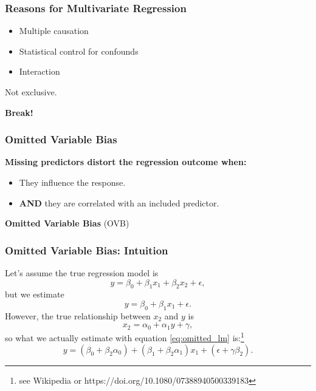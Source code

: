 \documentclass{beamer}
\begin{document}
\begin{frame}
  \frametitle{Reasons for Multivariate Regression}
  \begin{itemize}
    \item Multiple causation
    \item Statistical control for confounds
    \item Interaction
  \end{itemize}

Not exclusive.

\end{frame}

\begin{frame}
    \centering
    \huge\color{purple}\textbf{Break!}
\end{frame}

\begin{frame}
  \frametitle{Omitted Variable Bias}
  \textbf{Missing predictors distort the regression outcome when:}
  \begin{itemize}
    \item They influence the response.
    \item \textbf{AND} they are correlated with an included predictor.
  \end{itemize}

\vspace{0.5cm}
  
  \begin{block}{}
  \centering
    \large\textbf{Omitted Variable Bias} (OVB)
  \end{block}
\end{frame}

\begin{frame}
  \frametitle{Omitted Variable Bias: Intuition}

Let's assume the true regression model is
\begin{equation}
    y = \beta_0 + \beta_1 x_1 + \beta_2 x_2 + \epsilon,
\end{equation}
but we estimate
\begin{equation} \label{eq:omitted_lm}
    y = \beta_0 + \beta_1 x_1 + \epsilon.
\end{equation}
However, the true relationship between $x_2$ and $y$ is
\begin{equation*}
    x_2 = \alpha_0 + \alpha_1 y + \gamma,
\end{equation*}
so what we actually estimate with equation \ref{eq:omitted_lm} is:\footnote{see Wikipedia or https://doi.org/10.1080/07388940500339183}
\begin{equation*}
    y = (\beta_0 + \beta_2 \alpha_0) + (\beta_1 + \beta_2 \alpha_1) x_1 + (\epsilon + \gamma \beta_2).
\end{equation*}

\end{frame}
\end{document}
